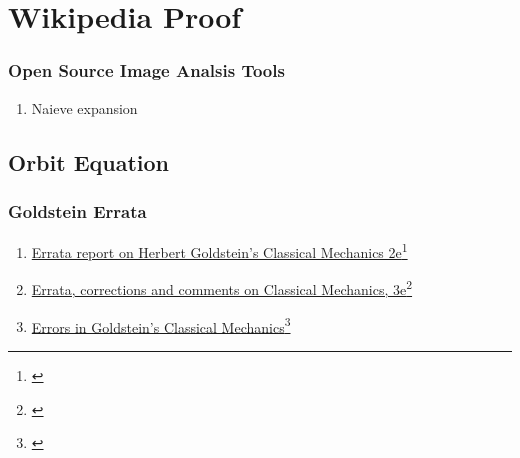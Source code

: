 % 

\section{Wikipedia Proof}
\begin{frame}\frametitle{Open Source Image Analsis Tools}
\begin{enumerate}
	\item Naieve expansion
\end{enumerate}
\end{frame}


\subsection{Orbit Equation}

\begin{frame}\frametitle{Goldstein Errata}
\begin{enumerate}
	\item \href{https://www.osti.gov/servlets/purl/6712863}{Errata report on Herbert Goldstein's Classical Mechanics 2e}\footnote{\cite{osti_6712863}}
	\item \href{http://astro.physics.sc.edu/goldstein/}{Errata, corrections and comments on Classical Mechanics, 3e}\footnote{\cite{goldstein3errata}}
	\item \href{https://pubs.aip.org/aapt/ajp/article-abstract/71/2/103/1055926/Errors-in-Goldstein-s-Classical-Mechanics?redirectedFrom=fulltext}{Errors in Goldstein’s Classical Mechanics}\footnote{\cite{tiersten2003errors}}
\end{enumerate}
\end{frame}

\endinput  %
